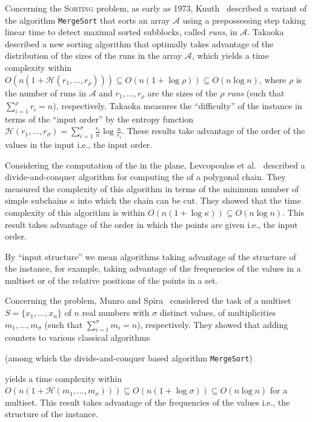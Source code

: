 Concerning the \textsc{Sorting} problem, as early as 1973,
Knuth~\cite{1973-BOOK-TheArtOfComputerProgrammingVol3-Knuth} described
a variant of the algorithm {\tt{MergeSort}} that sorts an array
$\mathcal{A}$ using a prepossessing step taking linear time to detect
maximal sorted subblocks, called \emph{runs}, in $\mathcal{A}$.
Takaoka~\cite{2009-Chapter-PartialSolutionAndEntropy-Takaoka}
described a new sorting algorithm that optimally takes advantage of
the distribution of the sizes of the runs in the array $\mathcal{A}$,
which yields a time complexity within
$O(n(1+\mathcal{H}(r_1, \dots, r_{\rho}))) \subseteq
O(n(1{+}\log{\rho})) \subseteq O(n\log{n})$, where $\rho$ is the
number of runs in $\mathcal{A}$ and $r_1, \dots, r_{\rho}$ are the
sizes of the $\rho$ \emph{runs} (such that $\sum_{i=1}^\rho {r_i}=n$),
respectively. Takaoka measures the ``difficulty'' of the instance in
terms of the ``input order'' by the entropy function
$\mathcal{H}(r_1, \dots, r_\sigma) =
\sum_{i=1}^\sigma{\frac{r_i}{n}}\log{\frac{n}{r_i}}$. These results
take advantage of the order of the values in the input i.e., the input
order.

Considering the computation of the {} in the plane,
Levcopoulos et
al.~\cite{2002-SWAT-AdaptiveAlgorithmsForConstructingConvexHullsAndTriangulationsOfPolygonalChains-LevcopoulosLingasMitchell}
described a divide-and-conquer algorithm for computing the {} of a polygonal chain. They measured the complexity of this
algorithm in terms of the minimum number of simple subchains $\kappa$
into which the chain can be cut.  They showed that the time complexity
of this algorithm is within
$O(n(1{+}\log{\kappa})) \subseteq O(n\log{n})$. This result takes
advantage of the order in which the points are given i.e., the input
order.

By ``input structure'' we mean algorithms taking advantage of the structure of the instance, for example, taking advantage of the frequencies of the values in a multiset or of the relative positions of the points in a set.

Concerning the {} problem, Munro and
Spira~\cite{1976-JComp-SortingAndSearchingInMultisets-MunroSpira}
considered the task of {} a multiset
$S=\{x_1, \dots, x_n\}$ of $n$ real numbers with $\sigma$ distinct
values, of multiplicities $m_1, \dots, m_\sigma$ (such that
$\sum_{i=1}^\sigma {m_i}=n$), respectively. They showed that adding
counters to various classical algorithms
\begin{INUTILE}
  (among which the divide-and-conquer based algorithm
  {\tt{MergeSort}})
\end{INUTILE}
yields a time complexity within
$O(n(1+\mathcal{H}(m_1, \dots, m_\sigma))) \subseteq
O(n(1{+}\log{\sigma})) \subseteq O(n\log{n})$ for {} a
multiset. This result takes advantage of
the frequencies of the values i.e., the structure of the instance.

